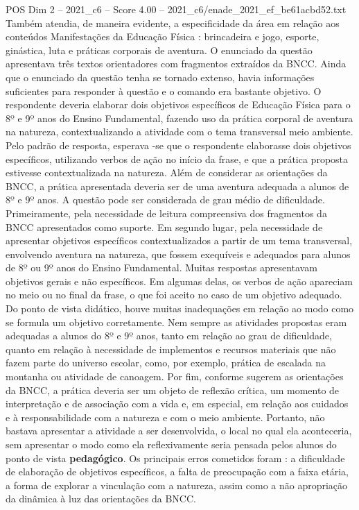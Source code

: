 \begin{textsample}{POS Dim 2 – 2021\_c6 – Score 4.00 – 2021\_c6/enade\_2021\_ef\_be61acbd52.txt}
Também atendia, de maneira evidente, a especificidade da área em relação aos conteúdos Manifestações da Educação Física : brincadeira e jogo, esporte, ginástica, luta e práticas corporais de aventura.
O enunciado da questão apresentava três textos orientadores com fragmentos extraídos da BNCC.
Ainda que o enunciado da questão tenha se tornado extenso, havia informações suficientes para responder à questão e o comando era bastante objetivo.
O respondente deveria elaborar dois objetivos específicos de Educação Física para o 8º e 9º anos do Ensino Fundamental, fazendo uso da prática corporal de aventura na natureza, contextualizando a atividade com o tema transversal meio ambiente.
Pelo padrão de resposta, esperava -se que o respondente elaborasse dois objetivos específicos, utilizando verbos de ação no início da frase, e que a prática proposta estivesse contextualizada na natureza.
Além de considerar as orientações da BNCC, a prática apresentada deveria ser de uma aventura adequada a alunos de 8º e 9º anos.
A questão pode ser considerada de grau médio de dificuldade.
Primeiramente, pela necessidade de leitura compreensiva dos fragmentos da BNCC apresentados como suporte.
Em segundo lugar, pela necessidade de apresentar objetivos específicos contextualizados a partir de um tema transversal, envolvendo aventura na natureza, que fossem exequíveis e adequados para alunos de 8º ou 9º anos do Ensino Fundamental.
Muitas respostas apresentavam objetivos gerais e não específicos.
Em algumas delas, os verbos de ação apareciam no meio ou no final da frase, o que foi aceito no caso de um objetivo adequado.
Do ponto de vista didático, houve muitas inadequações em relação ao modo como se formula um objetivo corretamente.
Nem sempre as atividades propostas eram adequadas a alunos do 8º e 9º anos, tanto em relação ao grau de dificuldade, quanto em relação à necessidade de implementos e recursos materiais que não fazem parte do universo escolar, como, por exemplo, prática de escalada na montanha ou atividade de canoagem.
Por fim, conforme sugerem as orientações da BNCC, a prática deveria ser um objeto de reflexão crítica, um momento de interpretação e de associação com a vida e, em especial, em relação aos cuidados e à responsabilidade com a natureza e com o meio ambiente.
Portanto, não bastava apresentar a atividade a ser desenvolvida, o local no qual ela aconteceria, sem apresentar o modo como ela reflexivamente seria pensada pelos alunos do ponto de vista \textbf{pedagógico}.
Os principais erros cometidos foram : a dificuldade de elaboração de objetivos específicos, a falta de preocupação com a faixa etária, a forma de explorar a vinculação com a natureza, assim como a não apropriação da dinâmica à luz das orientações da BNCC.

\end{textsample}
